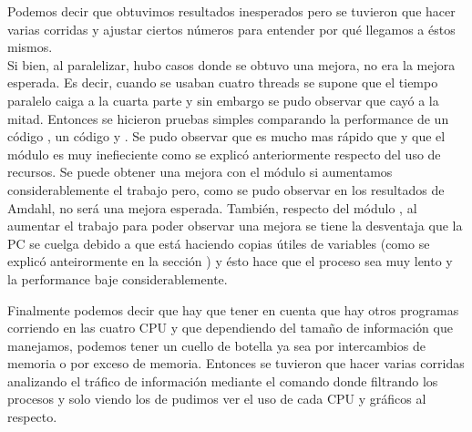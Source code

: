 Podemos decir que obtuvimos resultados inesperados pero se tuvieron que hacer
varias corridas y ajustar ciertos números para entender por qué llegamos a
éstos mismos.\\
Si bien, al paralelizar, hubo casos donde se obtuvo una mejora, no era la mejora
esperada. Es decir, cuando se usaban cuatro threads se supone que el tiempo paralelo
caiga a la cuarta parte y sin embargo se pudo observar que cayó a la mitad. Entonces
se hicieron pruebas simples comparando la performance de un código , un
código  y . Se pudo observar que 
es mucho mas rápido que  y que el módulo  es muy inefieciente
como se explicó anteriormente respecto del uso de recursos. Se puede obtener una mejora
con el módulo  si aumentamos considerablemente el trabajo pero, como
se pudo observar en los resultados de Amdahl, no será una mejora esperada.
También, respecto del módulo , al aumentar el trabajo para poder observar
una mejora se tiene la desventaja que la PC se cuelga debido a que 
está haciendo copias útiles de variables (como se explicó anteirormente en la
sección ) y ésto hace que el proceso sea muy lento
y la performance baje considerablemente.

Finalmente podemos decir que hay que tener en cuenta que hay otros programas
corriendo en las cuatro CPU y que dependiendo del tamaño de información que
manejamos, podemos tener un cuello de botella ya sea por intercambios de memoria
o por exceso de memoria.
Entonces se tuvieron que hacer varias corridas analizando el tráfico de
información mediante el comando  donde filtrando
los procesos y solo viendo los de  pudimos ver el uso de cada CPU
y gráficos al respecto.
